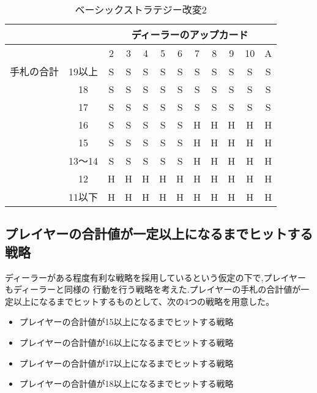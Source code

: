 \begin{table}[htbp]
  \centering
  \caption{ベーシックストラテジー改変2\label{bschange2}}
  \begin{tabular}{|c|c|c|c|c|c|c|c|c|c|c|c|}
    \hline
    \multicolumn{2}{|c|}{} & \multicolumn{10}{|c|}{ディーラーのアップカード} \\ \hline
    \multicolumn{2}{|c|}{} & 2 & 3 & 4 & 5 & 6 & 7 & 8 & 9 & 10 & A \\ \hline
    手札の合計 & 19以上 & S & S & S & S & S & S & S & S & S & S \\ \cline{3-12}
              & 18 & S & S & S & S & S & S & S & S & S & S \\ \cline{3-12}
              & 17 & S & S & S & S & S & S & S & S & S & S \\ \cline{3-12}
              & 16 & S & S & S & S & S & H & H & H & H & H \\ \cline{3-12}
              & 15 & S & S & S & S & S & H & H & H & H & H \\ \cline{3-12}
              & 13～14 & S & S & S & S & S & H & H & H & H & H \\ \cline{3-12}
              & 12 & H & H & H & H & H & H & H & H & H & H \\ \cline{3-12}
              & 11以下 & H & H & H & H & H & H & H & H & H & H \\ \hline
  \end{tabular}
\end{table}

\subsection{プレイヤーの合計値が一定以上になるまでヒットする戦略}
ディーラーがある程度有利な戦略を採用しているという仮定の下で,プレイヤーもディーラーと同様の
行動を行う戦略を考えた.プレイヤーの手札の合計値が一定以上になるまでヒットするものとして、次の4つの戦略を用意した。
\begin{itemize}
  \item プレイヤーの合計値が15以上になるまでヒットする戦略
  \item プレイヤーの合計値が16以上になるまでヒットする戦略
  \item プレイヤーの合計値が17以上になるまでヒットする戦略
  \item プレイヤーの合計値が18以上になるまでヒットする戦略
\end{itemize}

